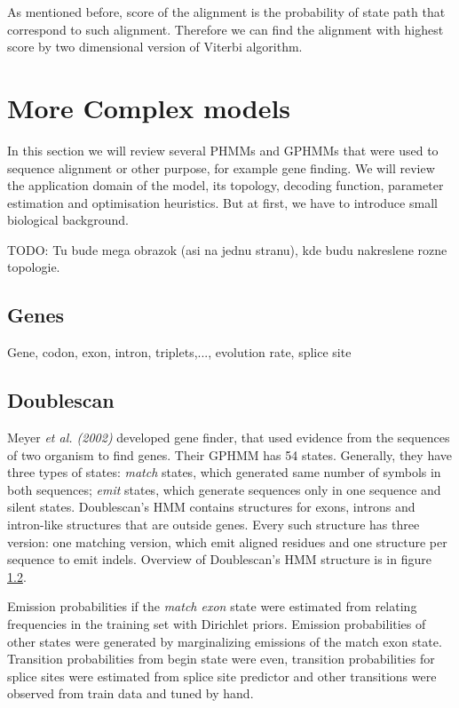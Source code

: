 As mentioned before, score of the alignment is the probability of state path
that correspond to such alignment. Therefore we can find the alignment with 
highest score by two dimensional version of Viterbi algorithm. 

\section{More Complex models}

In this section we will review several PHMMs and GPHMMs that were used to
sequence alignment or other purpose, for example gene finding. We will review
the application domain of the model, its topology, decoding function, parameter
estimation and optimisation heuristics. But at first, we have to introduce small
biological background.

TODO: Tu bude mega obrazok (asi na jednu stranu), kde budu nakreslene rozne
topologie.

\subsection{Genes}

Gene, codon, exon, intron, triplets,..., evolution rate, splice site

\subsection{Doublescan}
Meyer {\it et al. (2002)} developed gene finder, that used evidence from the
sequences of two organism to find genes. Their GPHMM has 54 states. Generally,
they have three types of states: {\it match} states, which generated same number
of symbols in both sequences;   {\it emit} states, which generate sequences only
in one sequence and silent states. Doublescan's HMM contains structures for
exons, introns and intron-like structures that are outside genes. Every such
structure has three version: one matching version, which emit aligned residues
and one structure per sequence to emit indels.  Overview of Doublescan's HMM
structure is in figure \ref{}. 
\nocite{Meyer2002}

Emission probabilities if the {\it match exon} state were estimated from
relating frequencies in the training set with Dirichlet priors.
Emission probabilities of other states were generated  by marginalizing
emissions of the match exon state. Transition probabilities from begin state
were even, transition probabilities for splice sites were estimated from splice
site predictor and other transitions were observed from train data and tuned by
hand.

